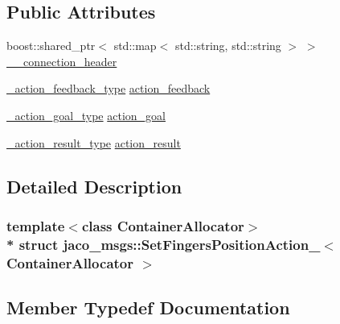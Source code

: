 \subsection*{Public Attributes}
\begin{DoxyCompactItemize}
\item 
boost\+::shared\+\_\+ptr$<$ std\+::map$<$ std\+::string, std\+::string $>$ $>$ \hyperlink{structjaco__msgs_1_1SetFingersPositionAction___a9afe6cca2a76ae6d48c8b0af01b1616b}{\+\_\+\+\_\+connection\+\_\+header}
\item 
\hyperlink{structjaco__msgs_1_1SetFingersPositionAction___a54563ee7e767db8e6268b91ef39d5cb6}{\+\_\+action\+\_\+feedback\+\_\+type} \hyperlink{structjaco__msgs_1_1SetFingersPositionAction___a63d4e32eae92c1eb8284813b5c6e8323}{action\+\_\+feedback}
\item 
\hyperlink{structjaco__msgs_1_1SetFingersPositionAction___a37902d96f4f497c90f453085f9f8d9d8}{\+\_\+action\+\_\+goal\+\_\+type} \hyperlink{structjaco__msgs_1_1SetFingersPositionAction___a35a5e82537b8fceaae4c0eef45b1e572}{action\+\_\+goal}
\item 
\hyperlink{structjaco__msgs_1_1SetFingersPositionAction___ab486a84dee9108af1e1b18fdd3c19bb2}{\+\_\+action\+\_\+result\+\_\+type} \hyperlink{structjaco__msgs_1_1SetFingersPositionAction___addb918b75ecf45c25c778e6621200058}{action\+\_\+result}
\end{DoxyCompactItemize}


\subsection{Detailed Description}
\subsubsection*{template$<$class Container\+Allocator$>$\\*
struct jaco\+\_\+msgs\+::\+Set\+Fingers\+Position\+Action\+\_\+$<$ Container\+Allocator $>$}



\subsection{Member Typedef Documentation}
